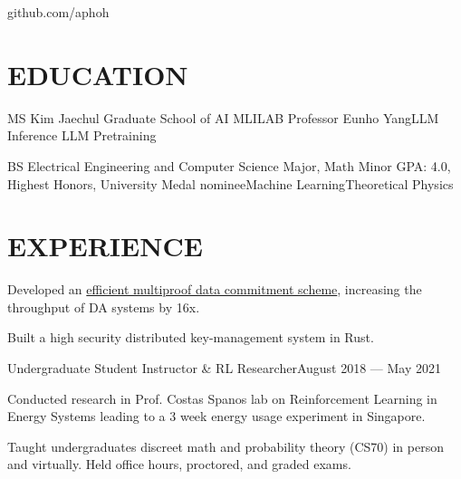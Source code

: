 \documentclass[10pt]{article}
\begin{document}
				 {github.com/aphoh}      

\section*{EDUCATION}

    {MS {\textendash} Kim Jaechul Graduate School of AI}
{MLILAB {\textendash} Professor Eunho Yang}{LLM Inference}{\; LLM Pretraining \;}

\vspace{0.4em}

    {BS {\textendash} Electrical Engineering and Computer Science Major, Math Minor}
{GPA: 4.0, Highest Honors, University Medal nominee}{Machine Learning}{Theoretical Physics}


\section*{EXPERIENCE}

            \begin{accomplishments}
              \item Developed an \href{https://aphoh.github.io/poly-multiproof/}{\color{teal} efficient multiproof data commitment scheme}, increasing the throughput of DA systems by 16x.
            \end{accomplishments}

          \begin{accomplishments}
            \item Built a high security distributed key-management system in Rust.
          \end{accomplishments}

            {Undergraduate Student Instructor \& RL Researcher}{August 2018 --- May 2021}
              \begin{accomplishments}
                \item Conducted research in Prof. Costas Spanos lab on Reinforcement Learning in Energy Systems leading to a 3 week energy usage experiment in Singapore.
                \item Taught undergraduates discreet math and probability theory (CS70) in person and virtually. Held office hours, proctored, and graded exams.
            \end{accomplishments}
\end{document}
